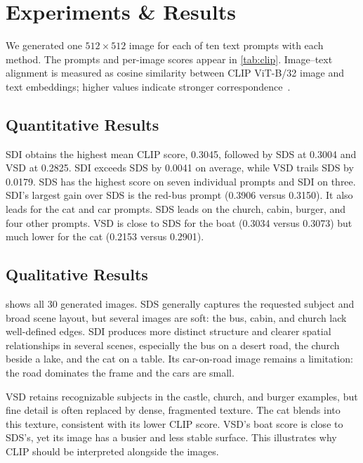 \section{Experiments \& Results}
\label{sec:exp}

We generated one $512\times512$ image for each of ten text prompts with each method. The prompts and per-image scores appear in \cref{tab:clip}. Image--text alignment is measured as cosine similarity between CLIP ViT-B/32 image and text embeddings; higher values indicate stronger correspondence~\cite{radford2021clip}.



\subsection{Quantitative Results}
\label{sec:quantitative}


SDI obtains the highest mean CLIP score, 0.3045, followed by SDS at 0.3004 and VSD at 0.2825. SDI exceeds SDS by 0.0041 on average, while VSD trails SDS by 0.0179. SDS has the highest score on seven individual prompts and SDI on three. SDI's largest gain over SDS is the red-bus prompt (0.3906 versus 0.3150). It also leads for the cat and car prompts. SDS leads on the church, cabin, burger, and four other prompts. VSD is close to SDS for the boat (0.3034 versus 0.3073) but much lower for the cat (0.2153 versus 0.2901).

\subsection{Qualitative Results}
\label{sec:qualitative}

 shows all 30 generated images. SDS generally captures the requested subject and broad scene layout, but several images are soft: the bus, cabin, and church lack well-defined edges. SDI produces more distinct structure and clearer spatial relationships in several scenes, especially the bus on a desert road, the church beside a lake, and the cat on a table. Its car-on-road image remains a limitation: the road dominates the frame and the cars are small.

VSD retains recognizable subjects in the castle, church, and burger examples, but fine detail is often replaced by dense, fragmented texture. The cat blends into this texture, consistent with its lower CLIP score. VSD's boat score is close to SDS's, yet its image has a busier and less stable surface. This illustrates why CLIP should be interpreted alongside the images.

